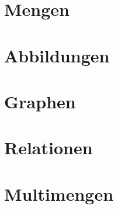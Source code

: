 \documentclass[a4paper,12pt, DIV12]{scrartcl}
\begin{document}

\newpage
\tableofcontents
\newpage
\section{Mengen}

\newpage


\newpage
\section{Abbildungen}

\newpage

\newpage

\newpage


\newpage
\section{Graphen}

\newpage

\newpage


\newpage
\section{Relationen}


\newpage
\section{Multimengen}

\end{document}
